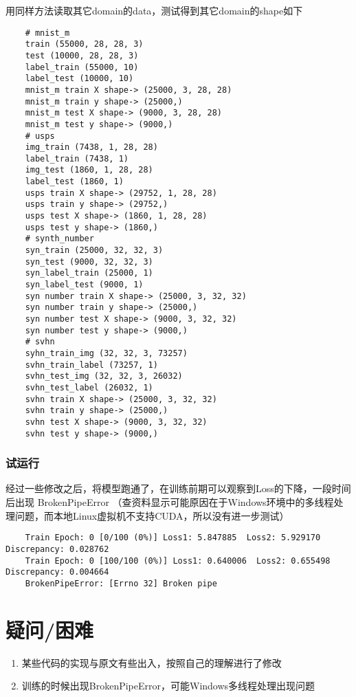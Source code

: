 \documentclass[UTF8]{ctexart}
\begin{document}
                用同样方法读取其它domain的data，测试得到其它domain的shape如下
                \begin{lstlisting}
    # mnist_m
    train (55000, 28, 28, 3)
    test (10000, 28, 28, 3)
    label_train (55000, 10)
    label_test (10000, 10)
    mnist_m train X shape-> (25000, 3, 28, 28)
    mnist_m train y shape-> (25000,)
    mnist_m test X shape-> (9000, 3, 28, 28)
    mnist_m test y shape-> (9000,)
    # usps
    img_train (7438, 1, 28, 28)
    label_train (7438, 1)
    img_test (1860, 1, 28, 28)
    label_test (1860, 1)
    usps train X shape-> (29752, 1, 28, 28)
    usps train y shape-> (29752,)
    usps test X shape-> (1860, 1, 28, 28)
    usps test y shape-> (1860,)
    # synth_number
    syn_train (25000, 32, 32, 3)
    syn_test (9000, 32, 32, 3)
    syn_label_train (25000, 1)
    syn_label_test (9000, 1)
    syn number train X shape-> (25000, 3, 32, 32)
    syn number train y shape-> (25000,)
    syn number test X shape-> (9000, 3, 32, 32)
    syn number test y shape-> (9000,)
    # svhn
    syhn_train_img (32, 32, 3, 73257)
    svhn_train_label (73257, 1)
    svhn_test_img (32, 32, 3, 26032)
    svhn_test_label (26032, 1)
    svhn train X shape-> (25000, 3, 32, 32)
    svhn train y shape-> (25000,)
    svhn test X shape-> (9000, 3, 32, 32)
    svhn test y shape-> (9000,)
                \end{lstlisting}
            \subsubsection{试运行}
                经过一些修改之后，将模型跑通了，在训练前期可以观察到Loss的下降，一段时间后出现
                BrokenPipeError
                （查资料显示可能原因在于Windows环境中的多线程处理问题，而本地Linux虚拟机不支持CUDA，所以没有进一步测试）
                \begin{lstlisting}
    Train Epoch: 0 [0/100 (0%)] Loss1: 5.847885  Loss2: 5.929170 Discrepancy: 0.028762
    Train Epoch: 0 [100/100 (0%)] Loss1: 0.640006  Loss2: 0.655498 Discrepancy: 0.004664
    BrokenPipeError: [Errno 32] Broken pipe
                \end{lstlisting}
    \section{疑问/困难}
        \begin{enumerate}
            \item 某些代码的实现与原文有些出入，按照自己的理解进行了修改
            \item 训练的时候出现BrokenPipeError，可能Windows多线程处理出现问题
        \end{enumerate}
\end{document}
